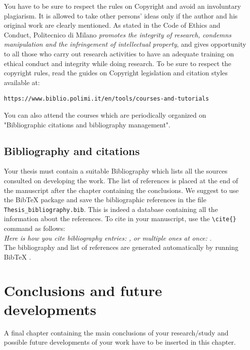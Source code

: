 \documentclass{Configuration_Files/PoliMi3i_thesis}
\begin{document}
You have to be sure to respect the rules on Copyright and avoid an involuntary plagiarism.
It is allowed to take other persons' ideas only if the author and his original work are clearly mentioned.
As stated in the Code of Ethics and Conduct, Politecnico di Milano \textit{promotes the integrity of research,
condemns manipulation and the infringement of intellectual property}, and gives opportunity to all those
who carry out research activities to have an adequate training on ethical conduct and integrity while doing research.
To be sure to respect the copyright rules, read the guides on Copyright legislation and citation styles available
at:
\begin{verbatim}
https://www.biblio.polimi.it/en/tools/courses-and-tutorials
\end{verbatim}
You can also attend the courses which are periodically organized on "Bibliographic citations and bibliography management".

\section{Bibliography and citations}
Your thesis must contain a suitable Bibliography which lists all the sources consulted on developing the work.
The list of references is placed at the end of the manuscript after the chapter containing the conclusions.
We suggest to use the BibTeX package and save the bibliographic references  in the file \verb|Thesis_bibliography.bib|.
This is indeed a database containing all the information about the references. To cite in your manuscript, use the \verb|\cite{}| command as follows:
\\
\textit{Here is how you cite bibliography entries: \cite{knuth74}, or multiple ones at once: \cite{knuth92,lamport94}}.
\\
The bibliography and list of references are generated automatically by running BibTeX \cite{bibtex}.

\chapter{Conclusions and future developments}
\label{ch:conclusions}%
A final chapter containing the main conclusions of your research/study
and possible future developments of your work have to be inserted in this chapter.

\end{document}
